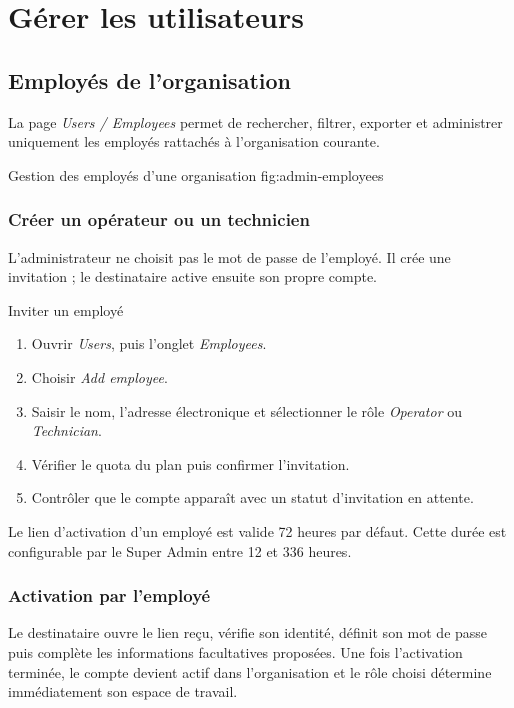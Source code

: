 \chapter{Gérer les utilisateurs}

\section{Employés de l'organisation}

La page \emph{Users / Employees} permet de rechercher, filtrer, exporter et
administrer uniquement les employés rattachés à l'organisation courante.

  {Gestion des employés d'une organisation}
  {fig:admin-employees}

\subsection{Créer un opérateur ou un technicien}

L'administrateur ne choisit pas le mot de passe de l'employé. Il crée une
invitation ; le destinataire active ensuite son propre compte.

\begin{procedurebox}{Inviter un employé}
  \begin{enumerate}[leftmargin=*]
    \item Ouvrir \emph{Users}, puis l'onglet \emph{Employees}.
    \item Choisir \emph{Add employee}.
    \item Saisir le nom, l'adresse électronique et sélectionner le rôle
    \emph{Operator} ou \emph{Technician}.
    \item Vérifier le quota du plan puis confirmer l'invitation.
    \item Contrôler que le compte apparaît avec un statut d'invitation en
    attente.
  \end{enumerate}
\end{procedurebox}

Le lien d'activation d'un employé est valide 72 heures par défaut. Cette durée
est configurable par le Super Admin entre 12 et 336 heures.

\subsection{Activation par l'employé}

Le destinataire ouvre le lien reçu, vérifie son identité, définit son mot de
passe puis complète les informations facultatives proposées. Une fois
l'activation terminée, le compte devient actif dans l'organisation et le rôle
choisi détermine immédiatement son espace de travail.

